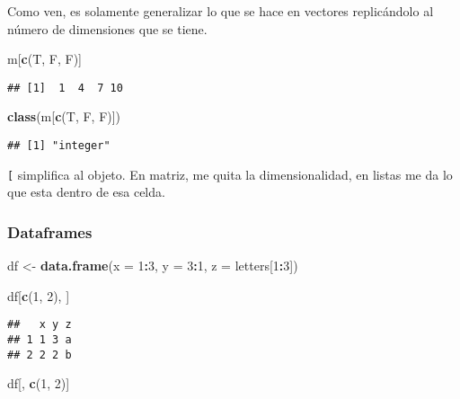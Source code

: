 \documentclass[]{article}
\newenvironment{Shaded}{\begin{snugshade}}{\end{snugshade}}
\newcommand{\KeywordTok}[1]{\textcolor[rgb]{0.13,0.29,0.53}{\textbf{#1}}}
\newcommand{\DataTypeTok}[1]{\textcolor[rgb]{0.13,0.29,0.53}{#1}}
\newcommand{\DecValTok}[1]{\textcolor[rgb]{0.00,0.00,0.81}{#1}}
\newcommand{\StringTok}[1]{\textcolor[rgb]{0.31,0.60,0.02}{#1}}
\newcommand{\OperatorTok}[1]{\textcolor[rgb]{0.81,0.36,0.00}{\textbf{#1}}}
\newcommand{\NormalTok}[1]{#1}
\begin{document}
Como ven, es solamente generalizar lo que se hace en vectores
replicándolo al número de dimensiones que se tiene.

\begin{Shaded}
\begin{Highlighting}[]
\NormalTok{m[}\KeywordTok{c}\NormalTok{(T, F, F)]}
\end{Highlighting}
\end{Shaded}

\begin{verbatim}
## [1]  1  4  7 10
\end{verbatim}

\begin{Shaded}
\begin{Highlighting}[]
\KeywordTok{class}\NormalTok{(m[}\KeywordTok{c}\NormalTok{(T, F, F)])}
\end{Highlighting}
\end{Shaded}

\begin{verbatim}
## [1] "integer"
\end{verbatim}

\texttt{{[}} simplifica al objeto. En matriz, me quita la
dimensionalidad, en listas me da lo que esta dentro de esa celda.

\subsubsection{Dataframes}\label{dataframes}

\begin{Shaded}
\begin{Highlighting}[]
\NormalTok{df <-}\StringTok{ }\KeywordTok{data.frame}\NormalTok{(}\DataTypeTok{x =} \DecValTok{1}\OperatorTok{:}\DecValTok{3}\NormalTok{, }\DataTypeTok{y =} \DecValTok{3}\OperatorTok{:}\DecValTok{1}\NormalTok{, }\DataTypeTok{z =}\NormalTok{ letters[}\DecValTok{1}\OperatorTok{:}\DecValTok{3}\NormalTok{])}

\NormalTok{df[}\KeywordTok{c}\NormalTok{(}\DecValTok{1}\NormalTok{, }\DecValTok{2}\NormalTok{), ]}
\end{Highlighting}
\end{Shaded}

\begin{verbatim}
##   x y z
## 1 1 3 a
## 2 2 2 b
\end{verbatim}

\begin{Shaded}
\begin{Highlighting}[]
\NormalTok{df[, }\KeywordTok{c}\NormalTok{(}\DecValTok{1}\NormalTok{, }\DecValTok{2}\NormalTok{)]}
\end{Highlighting}
\end{Shaded}
\end{document}
